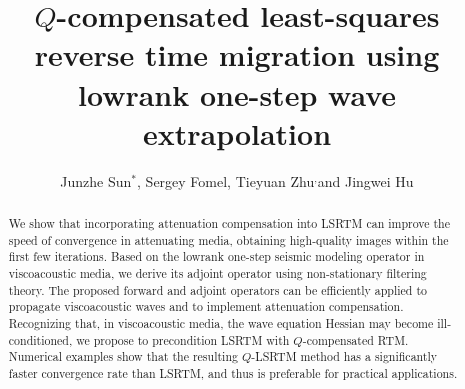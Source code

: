 \title{$Q$-compensated least-squares reverse time migration using lowrank one-step wave extrapolation}
\author{Junzhe Sun$^*$\footnotemark[1], Sergey Fomel\footnotemark[1], Tieyuan Zhu\footnotemark[1]$^,$\footnotemark[2] and Jingwei Hu\footnotemark[3]}
\maketitle

\address{
\footnotemark[1]Bureau of Economic Geology \\
John A. and Katherine G. Jackson School of Geosciences \\
The University of Texas at Austin \\
Austin, TX 78713 \\
\footnotemark[2] Department of Geosciences and Institute of Natural Gas Research \\
The Pennsylvania State University \\
University Park, PA 16802 \\
\footnotemark[3]Department of Mathematics \\
Purdue University \\
West Lafayette, IN 47907 
}


\begin{abstract}
 We show that incorporating attenuation compensation into LSRTM can improve the speed of convergence in attenuating media, obtaining high-quality images within the first few iterations. Based on the lowrank one-step seismic modeling operator in viscoacoustic media, we derive its adjoint operator using non-stationary filtering theory. The proposed forward and adjoint operators can be efficiently applied to propagate viscoacoustic waves and to implement attenuation compensation. Recognizing that, in viscoacoustic media, the wave equation Hessian may become ill-conditioned, we propose to precondition LSRTM with $Q$-compensated RTM. Numerical examples show that the resulting $Q$-LSRTM method has a significantly faster convergence rate than LSRTM, and thus is preferable for practical applications.

\end{abstract}

